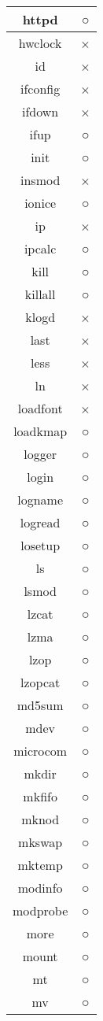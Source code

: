 \begin{longtable}{cc}
httpd & ○ \\ \hline
hwclock & × \\ \hline
id & × \\ \hline
ifconfig & × \\ \hline
ifdown & × \\ \hline
ifup & ○ \\ \hline
init & ○ \\ \hline
insmod & × \\ \hline
ionice & ○ \\ \hline
ip & × \\ \hline
ipcalc & ○ \\ \hline
kill & ○ \\ \hline
killall & ○ \\ \hline
klogd & × \\ \hline
last & × \\ \hline
less & × \\ \hline
ln & × \\ \hline
loadfont & × \\ \hline
loadkmap & ○ \\ \hline
logger & ○ \\ \hline
login & ○ \\ \hline
logname & ○ \\ \hline
logread & ○ \\ \hline
losetup & ○ \\ \hline
ls & ○ \\ \hline
lsmod & ○ \\ \hline
lzcat & ○ \\ \hline
lzma & ○ \\ \hline
lzop & ○ \\ \hline
lzopcat & ○ \\ \hline
md5sum & ○ \\ \hline
mdev & ○ \\ \hline
microcom & ○ \\ \hline
mkdir & ○ \\ \hline
mkfifo & ○ \\ \hline
mknod & ○ \\ \hline
mkswap & ○ \\ \hline
mktemp & ○ \\ \hline
modinfo & ○ \\ \hline
modprobe & ○ \\ \hline
more & ○ \\ \hline
mount & ○ \\ \hline
mt & ○ \\ \hline
mv & ○ \\ \hline

\end{longtable}
